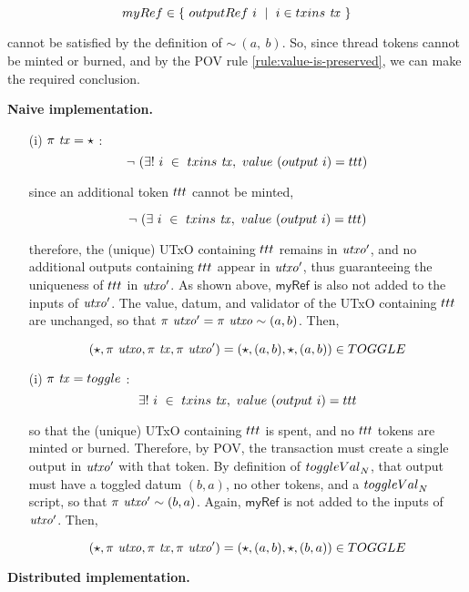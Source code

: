 \[\mathsf{myRef} \in \{ ~\outputref~i~\mid~i \in \inputs~\var{tx}~\} \]

cannot be satisfied by the definition of $\sim~(a,~b)$.
So, since thread tokens cannot be minted or burned, and by the POV rule
\ref{rule:value-is-preserved}, we can make the required conclusion.

\textbf{Naive implementation. }

\begin{itemize}
  \item[(i)] $\pi~\mathit{tx} = \star$ :
  \[ \neg ~(\exists !~i~ \in~\inputs~\var{tx},~\val~(\fun{output}~i) = \fun{ttt}) \]

  since an additional token $\fun{ttt}$ cannot be minted,

  \[ \neg ~(\exists ~i~ \in~\inputs~\var{tx},~\val~(\fun{output}~i) = \fun{ttt}) \]

  therefore, the (unique) UTxO containing $\fun{ttt}$ remains in $\mathit{utxo'}$,
  and no additional outputs containing $\fun{ttt}$ appear in $\mathit{utxo'}$,
  thus guaranteeing the uniqueness of $\fun{ttt}$ in $\mathit{utxo'}$.
  As shown above, $\mathsf{myRef}$ is also not added to the inputs of $\mathit{utxo'}$.
  The value, datum, and validator of the UTxO containing $\fun{ttt}$
  are unchanged, so that $\pi~\mathit{utxo'} = \pi~\mathit{utxo} \sim (a, b)$.
  Then,

  \[ (\emptytype, \pi~\var{utxo}, \pi~\var{tx}, \pi~\var{utxo'}) = (\emptytype, (a, b), \emptytype, (a, b)) \in \TOGGLE \]

  \item[(i)] $\pi~\var{tx} = \toggle$ :
  \[ \exists !~i~ \in~\inputs~\var{tx},~\val~(\fun{output}~i) = \fun{ttt} \]

  so that the (unique) UTxO containing $\fun{ttt}$ is spent,
  and no $\fun{ttt}$ tokens are minted or burned. Therefore, by POV,
  the transaction must create a single output in $\mathit{utxo'}$
  with that token. By definition of $\toggleVal_N$, that output must have a toggled datum
  $(b, a)$, no other tokens, and a $\toggleVal_N$ script, so that
  $\pi~\mathit{utxo'} \sim (b, a)$.
  Again, $\mathsf{myRef}$ is not added to the inputs of $\mathit{utxo'}$.
  Then,

  \[ (\emptytype, \pi~\var{utxo}, \pi~\var{tx}, \pi~\var{utxo'}) = (\emptytype, (a, b), \emptytype, (b, a)) \in \TOGGLE \]

\end{itemize}

\textbf{Distributed implementation. }

